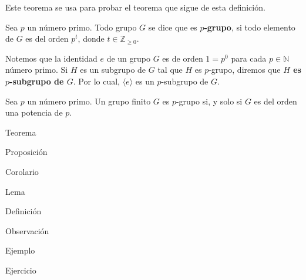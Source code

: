 \documentclass[12pt]{report}
\theoremstyle{largebreak}
\begin{document}
    Este teorema se usa para probar el teorema que sigue de esta definición.

    \begin{mydef}
        Sea $p$ un número primo. Todo grupo $G$ se dice que es \textbf{$p$-grupo}, si todo elemento de $G$ es del orden $p^t$, donde $t\in\mathbb{Z}_{\geq0}$.
    \end{mydef}

    Notemos que la identidad $e$ de un grupo $G$ es de orden $1=p^0$ para cada $p\in\mathbb{N}$ número primo. Si $H$ es un subgrupo de $G$ tal que $H$ es $p$-grupo, diremos que \textbf{$H$ es $p$-subgrupo de $G$}. Por lo cual, $\langle e\rangle$ es un $p$-subgrupo de $G$.

    \begin{propo}
        Sea $p$ un número primo. Un grupo finito $G$ es $p$-grupo si, y solo si $G$ es del orden una potencia de $p$.
    \end{propo}

    \newpage

    \begin{theor}[Nombre]
        Teorema
    \end{theor}

    \begin{propo}[Nombre]
        Proposición
    \end{propo}

    \begin{cor}[Nombre]
        Corolario
    \end{cor}

    \begin{lema}[Nombre]
        Lema
    \end{lema}

    \begin{mydef}[Nombre]
        Definición
    \end{mydef}

    \begin{obs}[Nombre]
        Observación
    \end{obs}

    \begin{exa}[Nombre]
        Ejemplo
    \end{exa}

    \begin{excer}[Nombre]
        Ejercicio
    \end{excer}
\end{document}

